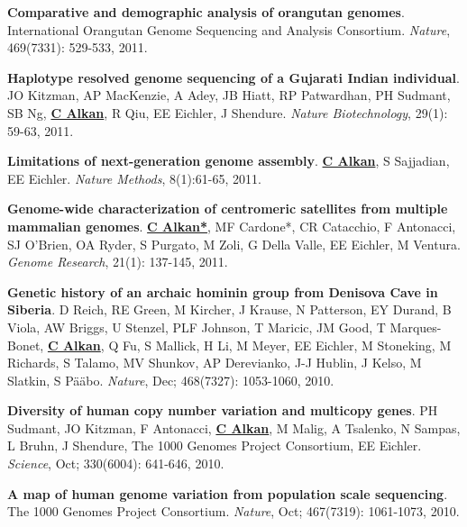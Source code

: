 \vspace{-.2cm}
{\bf Comparative and demographic analysis of orangutan genomes}. 
International Orangutan Genome Sequencing and Analysis Consortium.
{\em Nature}, 469(7331): 529-533, 2011.

\vspace{-.2cm}
{\bf Haplotype resolved genome sequencing of a Gujarati Indian individual}.
JO Kitzman, AP MacKenzie, A Adey, JB Hiatt, RP Patwardhan, 
PH Sudmant, SB Ng, {\bf {\underline{C Alkan}}}, R Qiu, EE
Eichler, J Shendure.
{\em Nature Biotechnology}, 29(1): 59-63, 2011.

\vspace{-.2cm}
{\bf Limitations of next-generation genome assembly}.
{\bf {\underline {C Alkan}}}, S Sajjadian, EE Eichler.
{\em Nature Methods}, 8(1):61-65, 2011. \\



\vspace{-.2cm}
{\bf Genome-wide characterization of centromeric satellites from multiple mammalian genomes}.
{\bf {\underline {C Alkan*}}}, MF Cardone*, CR Catacchio, F Antonacci,
 SJ O'Brien, OA Ryder, S Purgato, M Zoli, G Della Valle, EE Eichler, M Ventura.
{\em Genome Research}, 21(1): 137-145, 2011.


\vspace{-.2cm}
{\bf Genetic history of an archaic hominin group from Denisova Cave in Siberia}.
D Reich, RE Green, M Kircher, J Krause, 
N Patterson, EY Durand, B Viola, AW Briggs, 
U Stenzel, PLF Johnson, T Maricic, JM Good, 
T Marques-Bonet, {\bf {\underline {C Alkan}}}, Q Fu, S Mallick, H Li, 
M Meyer, EE Eichler, M Stoneking, M Richards, 
S Talamo, MV Shunkov, AP Derevianko, J-J Hublin, 
J Kelso, M Slatkin, S P\"{a}\"{a}bo.
{\em Nature}, Dec; 468(7327): 1053-1060, 2010.

\vspace{-.2cm}
{\bf Diversity of human copy number variation and multicopy genes}. PH Sudmant, JO Kitzman, F Antonacci, 
{\bf {\underline {C Alkan}}}, M Malig, A Tsalenko, N Sampas, L Bruhn, J Shendure, The 1000 Genomes Project Consortium, EE Eichler.
{\em Science}, Oct; 330(6004): 641-646, 2010.

\vspace{-.2cm}
{\bf A map of human genome variation from population scale sequencing}. The 1000 Genomes Project Consortium.
{\em Nature}, Oct; 467(7319): 1061-1073, 2010.


